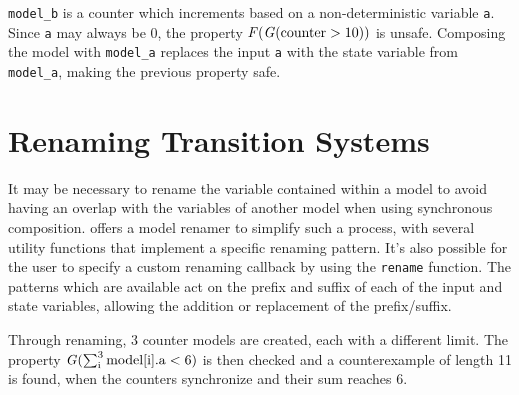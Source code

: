 \begin{listing}
    \label{alg:composition}
    \caption{\texttt{model\_b} is a counter which increments based on a non-deterministic variable \texttt{a}. Since \texttt{a} may always be 0, the property $\F (\G (\mathrm{counter} > 10))$ is unsafe.
    Composing the model with \texttt{model\_a} replaces the input \texttt{a} with the state variable from \texttt{model\_a}, making the previous property safe.}
\end{listing}

\section{Renaming Transition Systems}
It may be necessary to rename the variable contained within a model to avoid having an overlap with the variables of another model when using synchronous composition.
\pyvmt{} offers a model renamer to simplify such a process, with several utility functions that implement a specific renaming pattern.
It's also possible for the user to specify a custom renaming callback by using the \texttt{rename} function.
The patterns which are available act on the prefix and suffix of each of the input and state variables, allowing the addition or replacement of the prefix/suffix.


\begin{listing}[H]
    \label{alg:renaming}
    \caption{Through renaming, 3 counter models are created, each with a different limit.
    The property $\G (\sum_\textrm{i}^3 \mathrm{model[i].a} < 6)$ is then checked and a counterexample of length 11 is found, when the counters synchronize and their sum reaches 6.}
\end{listing}

